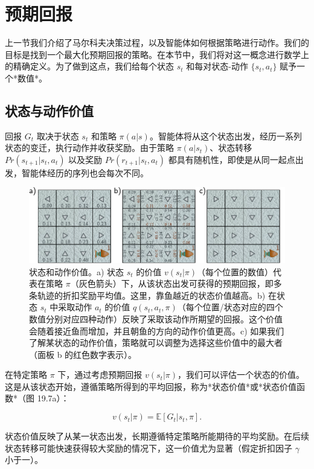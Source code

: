 \documentclass[lang=cn,newtx,10pt,scheme=chinese]{elegantbook}
\begin{document}
\section{预期回报}

上一节我们介绍了马尔科夫决策过程，以及智能体如何根据策略进行动作。我们的目标是找到一个最大化预期回报的策略。在本节中，我们将对这一概念进行数学上的精确定义。为了做到这点，我们给每个状态 \(s_t\) 和每对状态-动作 \(\{s_t, a_t\}\) 赋予一个*数值*。


\subsection{状态与动作价值}

回报 \(G_t\) 取决于状态 \(s_t\) 和策略 \(\pi(a|s)\)。智能体将从这个状态出发，经历一系列状态的变迁，执行动作并收获奖励。由于策略 \(\pi(a|s_t)\)、状态转移 \(Pr(s_{t+1}|s_t, a_t)\) 以及奖励 \(Pr(r_{t+1}|s_t, a_t)\) 都具有随机性，即使是从同一起点出发，智能体经历的序列也会每次不同。

\begin{figure}[ht!]
\centering
\includegraphics[width=0.7\linewidth]{PDFFigures/UDLChap19PDF/ReinforceValueOfAction.pdf}
\caption{状态和动作价值。a) 状态 \(s_t\) 的价值 \(v(s_t|\pi)\)（每个位置的数值）代表在策略 \(\pi\)（灰色箭头）下，从该状态出发可获得的预期回报，即多条轨迹的折扣奖励平均值。这里，靠鱼越近的状态价值越高。b) 在状态 \(s_t\) 中采取动作 \(a_t\) 的价值 \(q(s_t, a_t, \pi)\)（每个位置/状态对应的四个数值分别对应四种动作）反映了采取该动作所期望的回报。这个价值会随着接近鱼而增加，并且朝鱼的方向的动作价值更高。c) 如果我们了解某状态的动作价值，策略就可以调整为选择这些价值中的最大者（面板 b 的红色数字表示）。}
\end{figure}

在特定策略 \(\pi\) 下，通过考虑预期回报 \(v(s_t|\pi)\)，我们可以评估一个状态的价值。这是从该状态开始，遵循策略所得到的平均回报，称为*状态价值*或*状态价值函数*（图 19.7a）：

\begin{equation}
v(s_t|\pi) = \mathbb{E} [ G_t|s_t, \pi ]. 
\end{equation}

状态价值反映了从某一状态出发，长期遵循特定策略所能期待的平均奖励。在后续状态转移可能快速获得较大奖励的情况下，这一价值尤为显著（假定折扣因子 \(\gamma\) 小于一）。
\end{document}
